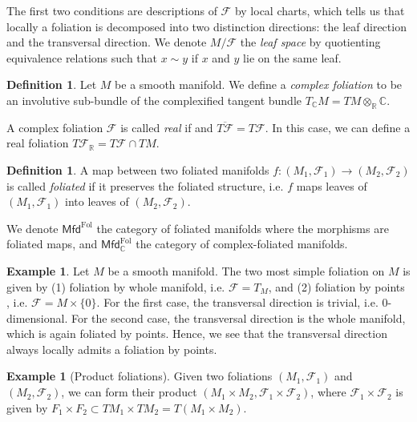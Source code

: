 \documentclass[12pt]{amsart}
\theoremstyle{definition}
\newtheorem{example}[thm]{Example}
\newtheorem{defn}[thm]{Definition}
\theoremstyle{remark}
\numberwithin{equation}{section}
\newcommand{\CF}{{\mathcal F}}
\newcommand{\R}{{\mathbb{R}}}
\newcommand{\C}{{\mathbb{C}}}
\newcommand{\1}{{\mathbb{1}}}
\newcommand{\mfd}{\mathsf{Mfd}}
\newcommand{\fol}{{\operatorname{Fol}}}
\begin{document}
The first two conditions are descriptions of $\CF$ by local charts, which tells us that locally a foliation is decomposed into two distinction directions: the leaf direction and the transversal direction. We denote $M/\CF$ the {\it leaf space} by quotienting equivalence relations such that $x\sim y$ if $x$ and $y$ lie on the same leaf.

\begin{defn}
	Let $M$ be a smooth manifold. We define a {\it complex foliation} to be an involutive sub-bundle of the complexified tangent bundle $T_{\C}M = TM\otimes_{\R} \C$.
\end{defn}
A complex foliation $\CF$ is called {\it real} if and  $\overline{T\CF} = T\CF$. In this case, we can define a real foliation $T\CF_{\R} = T\CF \cap TM$.
\begin{defn}
	A map between two foliated manifolds $f:(M_1, \CF_1)\to (M_2, \CF_2)$ is called {\it foliated} if it preserves the foliated structure, i.e. $f$ maps leaves of $(M_1, \CF_1)$ into leaves of $(M_2, \CF_2)$.
\end{defn}
We denote $\mfd^{\fol}$ the category of foliated manifolds where the morphisms are foliated maps, and $\mfd^{\fol}_{\C}$ the category of complex-foliated manifolds. 
\begin{example}
    Let $M$ be a smooth manifold. The two most simple foliation on $M$ is given by (1) foliation by whole manifold, i.e. $\CF = T_M$, and (2) foliation by points , i.e. $\CF = M\times \{0\}$. For the first case, the transversal direction is trivial, i.e. 0-dimensional. For the second case, the transversal direction is the whole manifold, which is again foliated by points. Hence, we see that the transversal direction always locally admits a foliation by points.
\end{example}

\begin{example}[Product foliations]
Given two foliations $(M_1, \CF_1)$ and $(M_2, \CF_2)$, we can form their product $(M_1\times M_2, \CF_1\times \CF_2)$, where $\CF_1\times \CF_2$ is given by $F_1\times F_2\subset TM_1\times TM_2 = T(M_1\times M_2)$.
\end{example}
\end{document}
